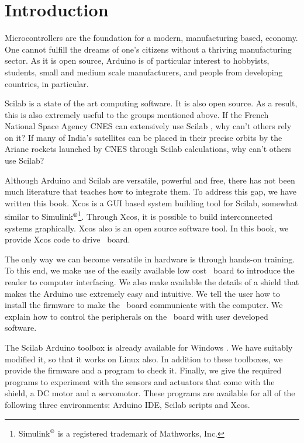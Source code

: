 \chapter{Introduction}
\thispagestyle{empty}
\label{sec:intro}
Microcontrollers are the foundation for a modern, manufacturing based,
economy.  One cannot fulfill the dreams of one's citizens without a
thriving manufacturing sector.  As it is open source, Arduino is of
particular interest to hobbyists, students, small and medium scale
manufacturers, and people from developing countries, in particular.

Scilab is a state of the art computing software.  It is also open
source.  As a result, this is also extremely useful to the groups
mentioned above.  If the French National Space Agency CNES can
extensively use Scilab \cite{CNES-Scilab}, why can't others rely on
it?  If many of India's satellites can be placed in their precise
orbits by the Ariane rockets launched by CNES through Scilab
calculations, why can't others use Scilab?

Although Arduino and Scilab are versatile, powerful and free, there
has not been much literature that teaches how to integrate them.  To
address this gap, we have written this book.  Xcos is a GUI based
system building tool for Scilab, somewhat similar to
Simulink$^{\text{\textregistered}}$\footnote{Simulink$^{\text{\textregistered}}$ is
  a registered trademark of Mathworks, Inc.}.  Through Xcos, it is
possible to build interconnected systems graphically.  Xcos also is an
open source software tool.  In this book, we provide Xcos code to
drive \arduino\ board.

The only way we can become versatile in hardware is through hands-on
training.  To this end, we make use of the easily available low cost
\arduino\ board to introduce the reader to computer interfacing.  We
also make available the details of a shield that makes the Arduino use
extremely easy and intuitive.  We tell the user how to install the
firmware to make the \arduino\ board communicate with the computer.
We explain how to control the peripherals on the \arduino\ board with
user developed software.

The Scilab Arduino toolbox is already available for Windows
\cite{scilab-arduino}.  We have suitably modified it, so that it works
on Linux also.  In addition to these toolboxes, we provide the
firmware and a program to check it.  Finally, we give the required
programs to experiment with the sensors and actuators that come with
the shield, a DC motor and a servomotor.  These programs are available
for all of the following three environments: Arduino IDE, Scilab
scripts and Xcos.

